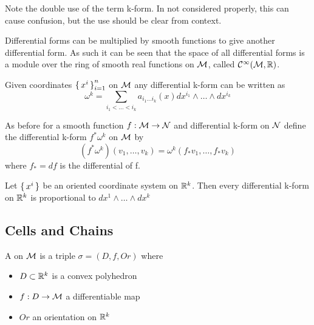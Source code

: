 \documentclass{article}
\begin{document}
\begin{remark}
Note the double use of the term k-form. In not considered properly, this can cause confusion, but the use should be clear from context. 
\end{remark}

\begin{fact}
Differential forms can be multiplied by smooth functions to give another differential form. As such it can be seen that the space of all differential forms is a module over the ring of smooth real functions on $\mathcal{M}$, called $\mathcal{C}^\infty(\mathcal{M},\mathbb{R})$.
\end{fact}

\begin{theorem}
Given coordinates $\set{x^i}_{i=1}^n$ on $\mathcal{M}$ any differential k-form can be written as 
\[
\omega^k = \sum_{i_1<\dots<i_k} a_{i_1 \dots i_k}(x) dx^{i_1} \wedge \dots \wedge dx^{i_k}
\]
\end{theorem}

\begin{definition}
As before for a smooth function $f:\mathcal{M}\to\mathcal{N}$ and differential k-form on $\mathcal{N}$ define the differential k-form $f^\ast\omega^k$ on $\mathcal{M}$ by 
\[
(f^\ast\omega^k)(v_1,\dots,v_k) = \omega^k(f_\ast v_1, \dots, f_\ast v_k)
\]
where $f_\ast = df$ is the differential of f. 
\end{definition}

\begin{theorem}
Let $\set{x^i}$ be an oriented coordinate system on $\mathbb{R}^k$. Then every differential k-form on $\mathbb{R}^k$ is proportional to $dx^1 \wedge \dots \wedge dx^k$
\end{theorem}

\subsection{Cells and Chains}

\begin{definition}
A  on $\mathcal{M}$ is a triple $\sigma=(D,f,Or)$ where 
\begin{itemize}
    \item $D\subset\mathbb{R}^k$ is a convex polyhedron
    \item $f:D\to\mathcal{M}$ a differentiable map
    \item $Or$ an orientation on $\mathbb{R}^k$
\end{itemize}
\end{definition}
\end{document}
